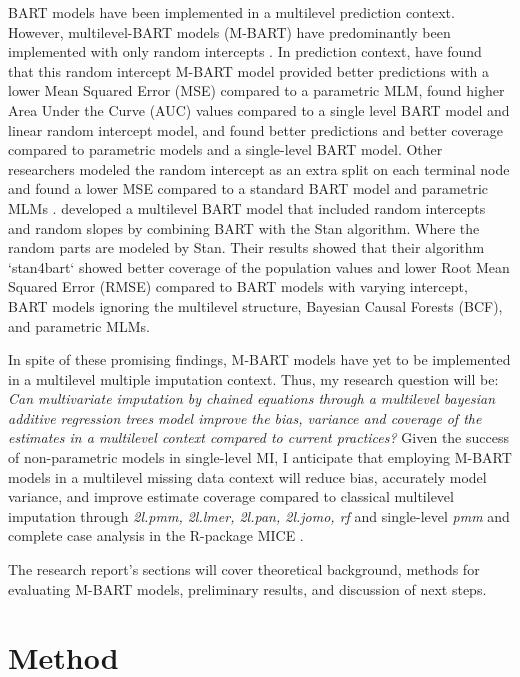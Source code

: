 \documentclass[10pt, a4paper, titlepage]{article}
\begin{document}
BART models have been implemented in a multilevel prediction context. However, multilevel-BART models (M-BART) have predominantly been implemented with only random intercepts \citep{chen2020, wagner2020, tan2016, wundervald2022}. In prediction context, \citet{wagner2020} have found that this random intercept M-BART model provided better predictions with a lower Mean Squared Error (MSE) compared to a parametric MLM, \citet{tan2016} found higher Area Under the Curve (AUC) values compared to a single level BART model and linear random intercept model, and \citet{chen2020} found better predictions and better coverage compared to parametric models and a single-level BART model. Other researchers modeled the random intercept as an extra split on each terminal node and found a lower MSE compared to a standard BART model and parametric MLMs \citep{wundervald2022}. \citet{dorie2022} developed a multilevel BART model that included random intercepts and random slopes by combining BART with the Stan algorithm. Where the random parts are modeled by Stan. Their results showed that their algorithm `stan4bart` showed better coverage of the population values and lower Root Mean Squared Error (RMSE) compared to BART models with varying intercept, BART models ignoring the multilevel structure, Bayesian Causal Forests (BCF), and parametric MLMs.

In spite of these promising findings, M-BART models have yet to be implemented in a multilevel multiple imputation context. Thus, my research question will be: \textit{Can multivariate imputation by chained equations through a multilevel bayesian additive regression trees model improve the bias, variance and coverage of the estimates in a multilevel context compared to current practices?} Given the success of non-parametric models in single-level MI, I anticipate that employing M-BART models in a multilevel missing data context will reduce bias, accurately model variance, and improve estimate coverage compared to classical multilevel imputation through \textit{2l.pmm, 2l.lmer, 2l.pan, 2l.jomo, rf} and single-level \textit{pmm} and complete case analysis in the R-package MICE \citep{buuren2011}.

The research report's sections will cover theoretical background, methods for evaluating M-BART models, preliminary results, and discussion of next steps.

\section{Method}
\end{document}
